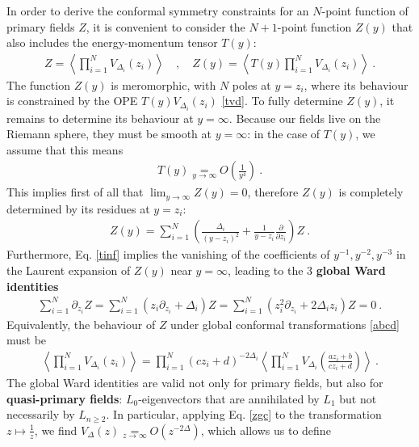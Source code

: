 \documentclass[12pt, a4paper]{article}
\newcommand{\myindex}[1]{\textbf{\boldmath #1}}
\begin{document}
In order to derive the conformal symmetry constraints for an $N$-point function of primary fields $Z$, it is convenient to consider the $N+1$-point function $Z(y)$ that also includes the energy-momentum tensor $T(y)$:
\begin{align}
 Z = \left< \prod_{i=1}^N V_{\Delta_i}(z_i)\right> \quad , \quad Z(y) = \left< T(y)\prod_{i=1}^N V_{\Delta_i}(z_i)\right>\ .
\end{align}
The function $Z(y)$ is meromorphic, with $N$ poles at $y=z_i$, where its behaviour is constrained by the OPE $T(y)V_{\Delta_i}(z_i)$ \eqref{tvd}. To fully determine $Z(y)$, it remains to determine its behaviour at $y=\infty$. Because our fields live on the Riemann sphere, they must be smooth at $y=\infty$: in the case of $T(y)$, we assume that this means 
\begin{align}
 T(y) \underset{y\to\infty} = O\left(\frac{1}{y^4}\right)\ .
 \label{tinf}
\end{align}
This implies first of all that $\lim_{y\to \infty} Z(y)=0$, therefore $Z(y)$ is completely determined by its residues at $y=z_i$:
\begin{align}
 Z(y) = \sum_{i=1}^N \left(\frac{\Delta_i}{(y-z_i)^2} +\frac{1}{y-z_i}\frac{\partial}{\partial z_i}\right) Z\ .
 \label{zy}
\end{align}
Furthermore, Eq. \eqref{tinf} implies the vanishing of the coefficients of $y^{-1},y^{-2},y^{-3}$ in the Laurent expansion of $Z(y)$ near $y=\infty$, leading to the 3 \myindex{global Ward identities} 
\begin{align}
 \sum_{i=1}^N \partial_{z_i} Z = \sum_{i=1}^N \left(z_i \partial_{z_i} + \Delta_i\right) Z = \sum_{i=1}^N \left(z_i^2 \partial_{z_i} + 2\Delta_iz_i\right) Z = 0\ .
 \label{gward}
\end{align}
Equivalently, the behaviour of $Z$ under global conformal transformations \eqref{abcd} must be
\begin{align}
 \boxed{\left< \prod_{i=1}^N V_{\Delta_i}(z_i) \right>
 = \prod_{i=1}^N (cz_i +d)^{-2\Delta_i}\left< \prod_{i=1}^N  V_{\Delta_i}\left(\frac{az_i+b}{cz_i+d}\right) \right> }\ .
 \label{zgc}
\end{align}
The global Ward identities are valid not only for primary fields, but also for \myindex{quasi-primary fields}: $L_0$-eigenvectors that are annihilated by $L_1$ but not necessarily by $L_{n\geq 2}$.
In particular, applying Eq. \eqref{zgc} to the transformation $z\mapsto \frac{1}{z}$, we find $V_\Delta(z)\underset{z\to\infty}{=} O(z^{-2\Delta})$, which allows us to define 
\end{document}
